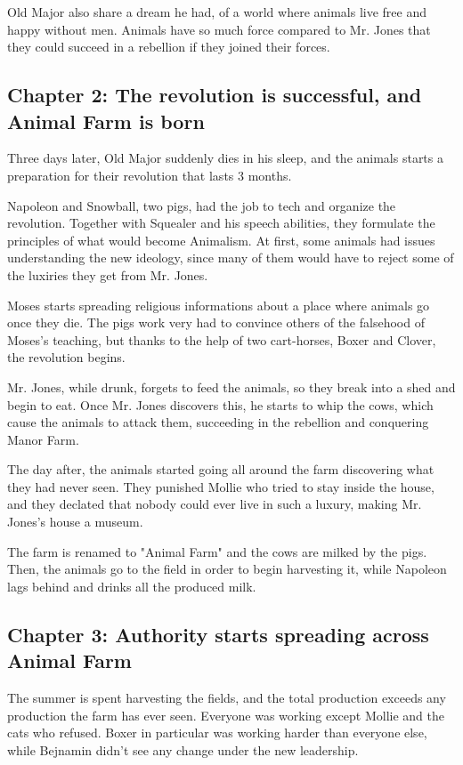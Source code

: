\documentclass{article}
\begin{document}
    Old Major also share a dream he had, of a world where animals live free and happy without men. Animals have so much force compared to Mr. Jones that they could succeed in a rebellion if they joined their forces.

    \subsection{Chapter 2: The revolution is successful, and Animal Farm is born}
    Three days later, Old Major suddenly dies in his sleep, and the animals starts a preparation for their revolution that lasts 3 months.

    Napoleon and Snowball, two pigs, had the job to tech and organize the revolution. Together with Squealer and his speech abilities, they formulate the principles of what would become Animalism. At first, some animals had issues understanding the new ideology, since many of them would have to reject some of the luxiries they get from Mr. Jones.

    Moses starts spreading religious informations about a place where animals go once they die. The pigs work very had to convince others of the falsehood of Moses's teaching, but thanks to the help of two cart-horses, Boxer and Clover, the revolution begins.

    Mr. Jones, while drunk, forgets to feed the animals, so they break into a shed and begin to eat. Once Mr. Jones discovers this, he starts to whip the cows, which cause the animals to attack them, succeeding in the rebellion and conquering Manor Farm.

    The day after, the animals started going all around the farm discovering what they had never seen. They punished Mollie who tried to stay inside the house, and they declated that nobody could ever live in such a luxury, making Mr. Jones's house a museum.

    The farm is renamed to "Animal Farm" and the cows are milked by the pigs. Then, the animals go to the field in order to begin harvesting it, while Napoleon lags behind and drinks all the produced milk.

    \subsection{Chapter 3: Authority starts spreading across Animal Farm}
    The summer is spent harvesting the fields, and the total production exceeds any production the farm has ever seen. Everyone was working except Mollie and the cats who refused. Boxer in particular was working harder than everyone else, while Bejnamin didn't see any change under the new leadership.
\end{document}
